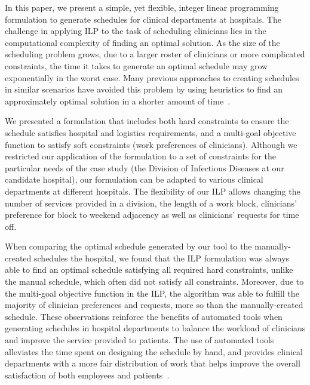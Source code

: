 In this paper, we present a simple, yet flexible, integer linear programming
formulation to generate schedules for clinical departments at hospitals.
The challenge in applying ILP to the task of scheduling clinicians lies in the
computational complexity of finding an optimal solution. As the size of the
scheduling problem grows, due to a larger roster of clinicians or more
complicated constraints, the time it takes to generate an optimal schedule may
grow exponentially in the worst case.
Many previous approaches to creating schedules in similar scenarios have avoided
this problem by using heuristics to find an approximately optimal solution 
in a shorter amount of time~\cite{burke_state_2004}.

We presented a formulation that includes both hard constraints to ensure the
schedule satisfies hospital and logistics requirements, and a multi-goal
objective function to satisfy soft constraints (work preferences of clinicians).
Although we restricted our application of the formulation to a set of
constraints for the particular needs of the case study 
(the Division of Infectious Diseases at our candidate hospital),
our formulation can be adapted to various
clinical departments at different hospitals. The flexibility of our ILP allows
changing the number of services provided in a division, the length of a work
block, clinicians' preference for block to weekend adjacency as well as
clinicians' requests for time off.

When comparing the optimal schedule generated by our tool to the
manually-created schedules the hospital, we found that the ILP
formulation was always able to find an optimal schedule satisfying all required
hard constraints, unlike the manual schedule, which often did not satisfy all
constraints. Moreover, due to the multi-goal objective function in
the ILP, the algorithm was able to fulfill the majority of clinician
preferences and requests, more so than the manually-created schedule. These
observations reinforce the benefits of automated tools when generating schedules
in hospital departments to balance the workload of clinicians and improve the
service provided to patients. The use of automated tools alleviates the time
spent on designing the schedule by hand, and provides clinical departments with
a more fair distribution of work that helps improve the overall satisfaction of
both employees and patients~\cite{silvestro_evaluation_2000}.

